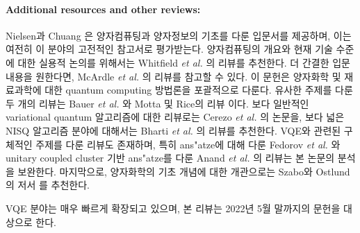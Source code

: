 \paragraph{Additional resources and other reviews:} Nielsen과 Chuang \cite{nielsenQuantumComputationQuantum2010}은 양자컴퓨팅과 양자정보의 기초를 다룬 입문서를 제공하며, 이는 여전히 이 분야의 고전적인 참고서로 평가받는다. 양자컴퓨팅의 개요와 현재 기술 수준에 대한 실용적 논의를 위해서는 Whitfield {\it et al.} \cite{Whitfield2022}의 리뷰를 추천한다. 더 간결한 입문 내용을 원한다면, McArdle {\it et al.} \cite{mcardleQuantumComputationalChemistry2018}의 리뷰를 참고할 수 있다. 이 문헌은 양자화학 및 재료과학에 대한 quantum computing 방법론을 포괄적으로 다룬다. 유사한 주제를 다룬 두 개의 리뷰는 Bauer {\it et al.} \cite{bauerQuantumAlgorithmsQuantum2020}와 Motta 및 Rice의 리뷰 \cite{Motta2021_review}이다. 보다 일반적인 variational quantum 알고리즘에 대한 리뷰로는 Cerezo {\it et al.} \cite{cerezoVariationalQuantumAlgorithms2020}의 논문을, 보다 넓은 NISQ 알고리즘 분야에 대해서는 Bharti {\it et al.} \cite{Bharti2021_review}의 리뷰를 추천한다. VQE와 관련된 구체적인 주제를 다룬 리뷰도 존재하며, 특히 ans{"{a}}tze에 대해 다룬 Fedorov {\it et al.} \cite{Fedorov2021}와 unitary coupled cluster 기반 ans{"{a}}tze를 다룬 Anand {\it et al.} \cite{Anand2021_review}의 리뷰는 본 논문의 분석을 보완한다. 마지막으로, 양자화학의 기초 개념에 대한 개관으로는 Szabo와 Ostlund의 저서 \cite{Szabo1996}를 추천한다.

VQE 분야는 매우 빠르게 확장되고 있으며, 본 리뷰는 2022년 5월 말까지의 문헌을 대상으로 한다.